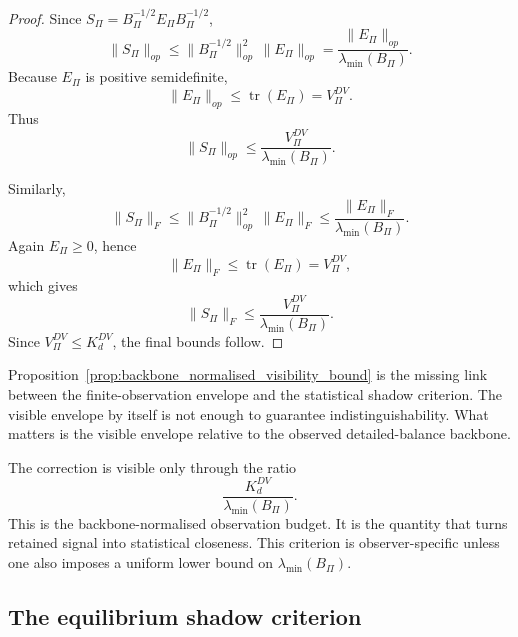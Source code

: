 \documentclass[11pt,a4paper]{article}
\numberwithin{equation}{section}
\theoremstyle{thmcompact}
\theoremstyle{remark}
\begin{document}
\begin{proof}
Since \(S_\Pi=B_\Pi^{-1/2}E_\Pi B_\Pi^{-1/2}\),
\begin{equation}
\|S_\Pi\|_{op}
\le
\|B_\Pi^{-1/2}\|_{op}^2\,\|E_\Pi\|_{op}
=
\frac{\|E_\Pi\|_{op}}{\lambda_{\min}(B_\Pi)}.
\end{equation}
Because \(E_\Pi\) is positive semidefinite,
\begin{equation}
\|E_\Pi\|_{op}\le \operatorname{tr}(E_\Pi)=V_\Pi^{DV}.
\end{equation}
Thus
\begin{equation}
\|S_\Pi\|_{op}\le \frac{V_\Pi^{DV}}{\lambda_{\min}(B_\Pi)}.
\end{equation}

Similarly,
\begin{equation}
\|S_\Pi\|_{F}
\le
\|B_\Pi^{-1/2}\|_{op}^2\,\|E_\Pi\|_{F}
\le
\frac{\|E_\Pi\|_{F}}{\lambda_{\min}(B_\Pi)}.
\end{equation}
Again \(E_\Pi\ge 0\), hence
\begin{equation}
\|E_\Pi\|_{F}\le \operatorname{tr}(E_\Pi)=V_\Pi^{DV},
\end{equation}
which gives
\begin{equation}
\|S_\Pi\|_{F}\le \frac{V_\Pi^{DV}}{\lambda_{\min}(B_\Pi)}.
\end{equation}
Since \(V_\Pi^{DV}\le K_d^{DV}\), the final bounds follow.
\end{proof}

Proposition~\ref{prop:backbone_normalised_visibility_bound} is the missing link between the finite-observation envelope and the statistical shadow criterion. The visible envelope by itself is not enough to guarantee indistinguishability. What matters is the visible envelope relative to the observed detailed-balance backbone.

The correction is visible only through the ratio
\begin{equation}
\frac{K_d^{DV}}{\lambda_{\min}(B_\Pi)}.
\end{equation}
This is the backbone-normalised observation budget. It is the quantity that turns retained signal into statistical closeness. This criterion is observer-specific unless one also imposes a uniform lower bound on \(\lambda_{\min}(B_\Pi)\).

\subsection{The equilibrium shadow criterion}
\end{document}
